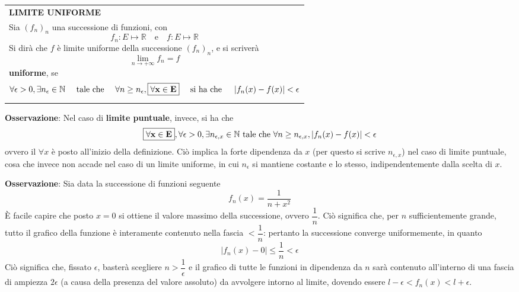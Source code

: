 \documentclass[a4paper]{extarticle}
\renewcommand\arraystretch{}
\begin{document}
\vspace{1em}
\setlength{\tabcolsep}{14pt}
\renewcommand{\arraystretch}{2}
\noindent
\begin{tabularx}{\textwidth}{@{}|P|@{}}
    \hline
    {\textbf{LIMITE UNIFORME}}\\
    \parbox{\linewidth}{Sia $(f_n)_n$ una successione di funzioni, con
    \[f_n : E \longmapsto \mathbb{R} \hspace{1em} \text{e} \hspace{1em} f : E \longmapsto \mathbb{R}\]
    Si dirà che $f$ è limite uniforme della successione $(f_n)_n$, e si scriverà
    \[\lim_{n \to +\infty} f_n = f\]
    \textbf{uniforme}, se
    \[\forall \epsilon > 0, \exists n_\epsilon \in \mathbb{N} \hspace{1em} \text{ tale che } \hspace{1em} \forall n \geq n_\epsilon, \boxed{\bf{\forall x \in E}} \hspace{1em} \text{ si ha che } \hspace{1em} \left \vert f_n(x) - f(x)\right \vert < \epsilon\]
    \vspace{-1mm}}\\
    \hline
\end{tabularx}

\vspace{2em}
\noindent
\textbf{Osservazione}: Nel caso di \textbf{limite puntuale}, invece, si ha che
\[\boxed{\bf{\forall x \in E}}, \forall \epsilon > 0, \exists n_{\epsilon, x} \in \mathbb{N} \text{ tale che } \forall n \geq n_{\epsilon, x}, \left \vert f_n(x) - f(x) \right \vert < \epsilon\]
ovvero il $\forall x$ è posto all'inizio della definizione. Ciò implica la forte dipendenza da $x$ (per questo si scrive $n_{\epsilon, x}$) nel caso di limite puntuale, cosa che invece non accade nel caso di un limite uniforme, in cui $n_\epsilon$ si mantiene costante e lo stesso, indipendentemente dalla scelta di $x$.

\vspace{1em}
\noindent
\textbf{Osservazione}: Sia data la successione di funzioni seguente
\[f_n(x) = \dfrac{1}{n+x^2}\]
È facile capire che posto $x=0$ si ottiene il valore massimo della successione, ovvero $\dfrac{1}{n}$. Ciò significa che, per $n$ sufficientemente grande, tutto il grafico della funzione è interamente contenuto nella fascia $<\dfrac{1}{n}$: pertanto la successione converge uniformemente, in quanto
\[\left \vert f_n(x) - 0 \right \vert \leq \dfrac{1}{n} < \epsilon\]
Ciò significa che, fissato $\epsilon$, basterà scegliere $n>\dfrac{1}{\epsilon}$ e il grafico di tutte le funzioni in dipendenza da $n$ sarà contenuto all'interno di una fascia di ampiezza $2\epsilon$ (a causa della presenza del valore assoluto) da avvolgere intorno al limite, dovendo essere $l-\epsilon<f_n(x)<l+\epsilon$.
\end{document}
